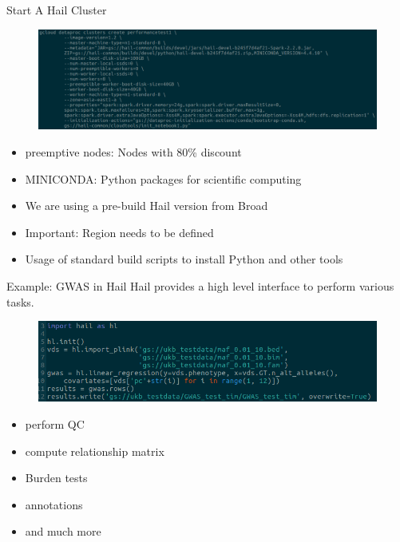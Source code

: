 \documentclass{beamer}
\begin{document}
\begin{frame}[t]{Start A Hail Cluster}

  \begin{figure}
    \centering
    \includegraphics[scale=0.25]{figure/cluster_command.png}
  \end{figure}
  \begin{itemize}
    \item preemptive nodes: Nodes with 80\% discount
    \item MINICONDA: Python packages for scientific computing
    \item We are using a pre-build Hail version from Broad
    \item Important: Region needs to be defined
    \item Usage of standard build scripts to install Python and other tools
  \end{itemize}  
\end{frame}

\begin{frame}{Example: GWAS in Hail}
  Hail provides a high level interface to perform various tasks.
  \begin{figure}
    \centering
    \includegraphics[scale=0.48]{figure/gwas_code.png}
  \end{figure}
  \begin{itemize}
    \item perform QC
    \item compute relationship matrix
    \item Burden tests
    \item annotations
    \item and much more
  \end{itemize}
\end{frame}
\end{document}
